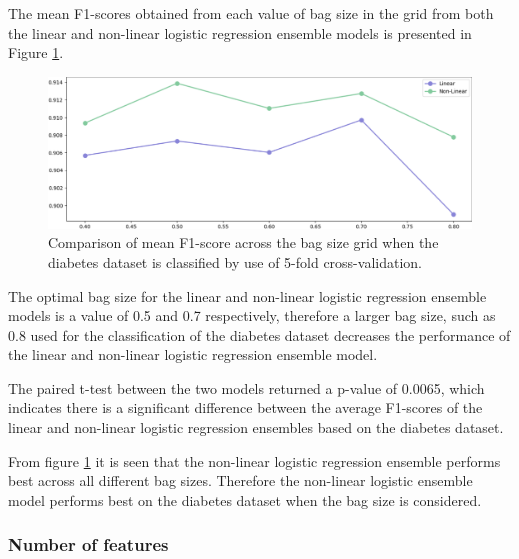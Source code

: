 \documentclass[10pt, conference]{IEEEtran}
\begin{document}
The mean F1-scores obtained from each value of bag size in the grid from both the linear and non-linear
logistic regression ensemble models is presented in Figure \ref{fig:D_bag_comparison}.
\begin{figure}[H]
    \centerline{\includegraphics[scale=0.26]{../Images/D_bag.PNG}}
    \caption{Comparison of mean F1-score across the bag size grid when the diabetes dataset is classified by use of 5-fold cross-validation.}
    \label{fig:D_bag_comparison}
\end{figure}
The optimal bag size for the linear and non-linear logistic regression ensemble models is a value of 0.5 and 0.7 respectively,
therefore a larger bag size, such as 0.8 used for the classification of the diabetes dataset decreases the
performance of the linear and non-linear logistic regression ensemble model.

The paired t-test between the two models returned a p-value of 0.0065, which indicates there is a significant difference
between the average F1-scores of the linear and non-linear logistic regression ensembles based on the diabetes dataset.

From figure \ref{fig:D_bag_comparison} it is seen that the non-linear logistic regression ensemble performs best across
all different bag sizes. Therefore the non-linear logistic ensemble model performs best on the diabetes dataset when the
bag size is considered.

\subsubsection{Number of features}
\end{document}
